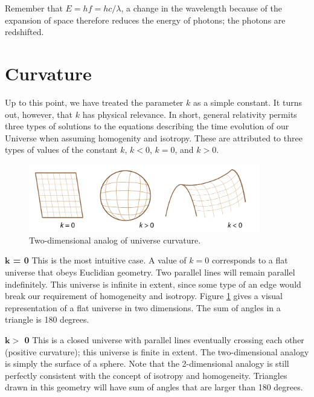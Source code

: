 \documentclass[a4paper,12pt]{article}
\theoremstyle{remark}
\newcommand{\mrm}[1]{\mathrm{#1}}
\renewcommand{\=}[1]{\stackrel{#1}{=}} %
\theoremstyle{plain}
\theoremstyle{definition}
\begin{document}
Remember that $E = hf = hc/\lambda$, a change in the wavelength because of the expansion of space therefore reduces the energy of photons; the photons are redshifted.  


\section{Curvature}
Up to this point, we have treated the parameter $k$ as a simple constant. It turns out, however, that $k$ has physical relevance. In short, general relativity permits three types of solutions to the equations describing the time evolution of our Universe when assuming homogenity and isotropy. These are attributed to three types of values of the constant $k$, $k < 0$, $k=0$, and $k>0$. %

\begin{figure}[t]
\begin{center}
    \includegraphics*[angle=0,width=0.9\textwidth]{img/curvature.png}
    \caption[Insert text]{Two-dimensional analog of universe curvature.}
\label{fig:curvature}
\end{center}
\end{figure}


\textbf{$\bm{k}$ = 0} This is the most intuitive case. A value of $k=0$ corresponds to a flat universe that obeys Euclidian geometry. Two parallel lines will remain parallel indefinitely. This universe is infinite in extent, since some type of an edge would break our requirement of homogeneity and isotropy. Figure \ref{fig:curvature} gives a visual representation of a flat universe in two dimensions. The sum of angles in a triangle is 180 degrees.

\textbf{$\bm{k} >$ 0}
This is a closed universe with parallel lines eventually crossing each other (positive curvature); this universe is finite in extent. The two-dimensional analogy is simply the surface of a sphere. Note that the 2-dimensional analogy is still perfectly consistent with the concept of isotropy and homogeneity. Triangles drawn in this geometry will have sum of angles that are larger than 180 degrees.
\end{document}

